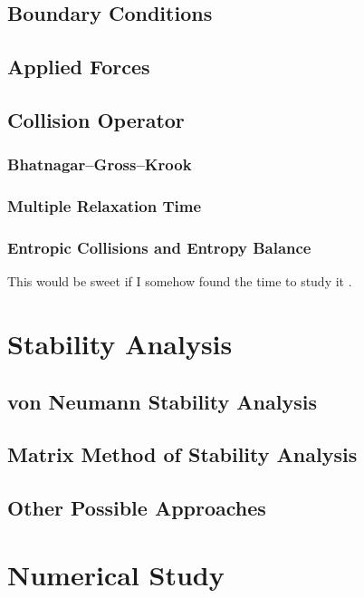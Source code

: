 \documentclass{article}
\begin{document}
\subsection{Boundary Conditions}

\subsection{Applied Forces}

\subsection{Collision Operator}

\subsubsection{Bhatnagar--Gross--Krook}

\subsubsection{Multiple Relaxation Time}

\subsubsection{Entropic Collisions and Entropy Balance}

{\color{red} This would be sweet if I somehow found the time to study it \cite{gorban2014enhancement}.}

\section{Stability Analysis}

\subsection{von Neumann Stability Analysis}

\subsection{Matrix Method of Stability Analysis}

\subsection{Other Possible Approaches}

\section{Numerical Study}
\end{document}
